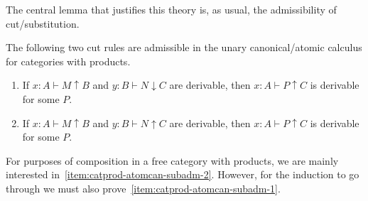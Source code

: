\documentclass{book}
\let\types\vdash
\newcommand{\atom}{\mathrel{\downarrow}}
\newcommand{\can}{\mathrel{\uparrow}}
\begin{document}
The central lemma that justifies this theory is, as usual, the admissibility of cut/substitution.

\begin{lem}\label{thm:catprod-atomcan-subadm}
  The following two cut rules are admissible in the unary canonical/atomic calculus for categories with products.
  \begin{enumerate}
  \item If $x:A\types M\can B$ and $y:B\types N\atom C$ are derivable, then $x:A\types P\can C$ is derivable for some $P$.\label{item:catprod-atomcan-subadm-1}
  \item If $x:A\types M\can B$ and $y:B\types N\can C$ are derivable, then $x:A\types P\can C$ is derivable for some $P$.\label{item:catprod-atomcan-subadm-2}
  \end{enumerate}
\end{lem}
For purposes of composition in a free category with products, we are mainly interested in~\ref{item:catprod-atomcan-subadm-2}.
However, for the induction to go through we must also prove~\ref{item:catprod-atomcan-subadm-1}.
\end{document}
